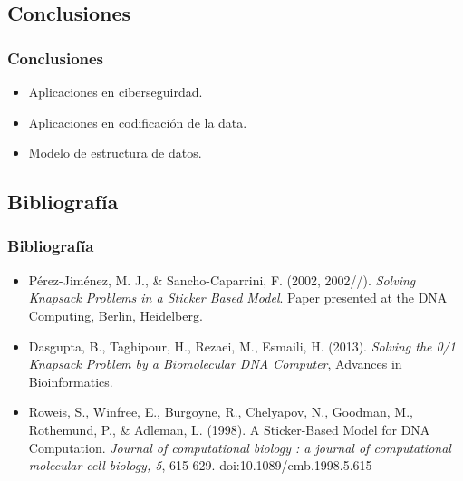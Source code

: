 \documentclass[12pt]{beamer}
\begin{document}
 \begin{frame}
     \section{Conclusiones}
     \frametitle{Conclusiones}
     \begin{itemize}
         \item Aplicaciones en ciberseguirdad.
         \item Aplicaciones en codificación de la data.
         \item Modelo de estructura de datos.
     \end{itemize}
 \end{frame}
 \begin{frame}
     \section{Bibliografía}
     \frametitle{Bibliografía}
    \begin{itemize}
        \item Pérez-Jiménez, M. J., \& Sancho-Caparrini, F. (2002, 2002//). \emph{Solving Knapsack Problems in a Sticker Based Model}. Paper presented at the DNA Computing, Berlin, Heidelberg.
        \item Dasgupta, B., Taghipour, H., Rezaei, M., Esmaili, H. (2013). \emph{Solving the 0/1 Knapsack Problem by a Biomolecular DNA Computer}, Advances in Bioinformatics.
        \item Roweis, S., Winfree, E., Burgoyne, R., Chelyapov, N., Goodman, M., Rothemund, P., \& Adleman, L. (1998). A Sticker-Based Model for DNA Computation. \emph{Journal of computational biology : a journal of computational molecular cell biology, 5}, 615-629. doi:10.1089/cmb.1998.5.615
    \end{itemize}
 \end{frame}
\end{document}

